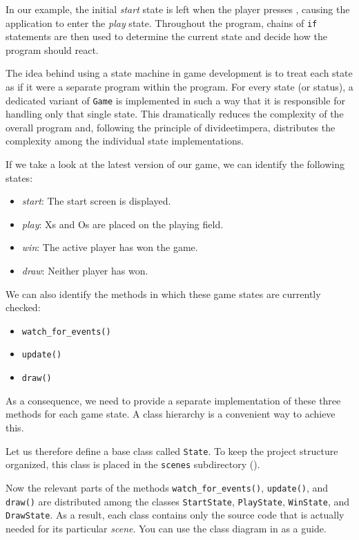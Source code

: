 In our example, the initial \emph{start} state is left when the player presses , causing the application to enter the \emph{play} state. Throughout the program, chains of \texttt{if} statements are then used to determine the current state and decide how the program should react.

The idea behind using a state machine in game development is to treat each state as if it were a separate program within the program. For every state (or status), a dedicated variant of \texttt{Game} is implemented in such a way that it is responsible for handling only that single state. This dramatically reduces the complexity of the overall program and, following the principle of \gls{divideetimpera}, distributes the complexity among the individual state implementations.

If we take a look at the latest version of our game, we can identify the following states:

\begin{itemize}
	\item \emph{start}: The start screen is displayed.
	\item \emph{play}: Xs and Os are placed on the playing field.
	\item \emph{win}: The active player has won the game.
	\item \emph{draw}: Neither player has won.
\end{itemize}

We can also identify the methods in which these game states are currently checked:

\begin{itemize}
	\item \texttt{watch\_for\_events()}
	\item \texttt{update()} 
	\item \texttt{draw()}
\end{itemize}

As a consequence, we need to provide a separate implementation of these three methods for each game state. A class hierarchy is a convenient way to achieve this.

Let us therefore define a base class called \texttt{State}. To keep the project structure organized, this class is placed in the \texttt{scenes} subdirectory ().


Now the relevant parts of the methods \texttt{watch\_for\_events()}, \texttt{update()}, and \texttt{draw()} are distributed among the classes \texttt{StartState}, \texttt{PlayState}, \texttt{WinState}, and \texttt{DrawState}. As a result, each class contains only the source code that is actually needed for its particular \emph{scene}. You can use the class diagram in  as a guide.

